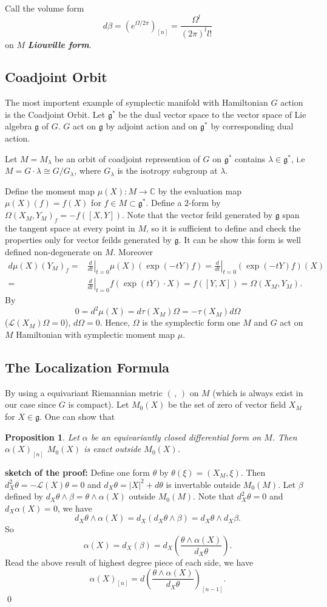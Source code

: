 \documentclass[12pt]{amsart}
\newtheorem{Prop}[Thm]{Proposition}
\def\cL{{\mathcal{L}}}
\def\bC{{\mathbb{C}}}
\def\fgg{{\mathfrak{g}}}
\def\kw#1{{\bf \em #1}}
\def\ddt{\left.\frac{d}{dt}\right|_{t=0}}
\def\sproof{{\bf sketch of the proof:}}
\begin{document}
Call the volume form 
\[
d\beta=(e^{\Omega/2\pi})_[n] = \frac{\Omega^l}{(2\pi)^ll!}
\] 
on $M$ \kw{Liouville form}.

\subsection{Coadjoint Orbit}\label{Sec:co1}
The most importent example of symplectic manifold with Hamiltonian $G$
action is the Coadjoint Orbit. 
Let $\fgg^*$ be the dual vector space to the vector space of Lie
algebra $\fgg$ of $G$. $G$ act on $\fgg$ by adjoint action and on
$\fgg^*$ by corresponding dual action.

Let $M=M_\lambda$ be an orbit of coadjoint represention of $G$ on
$\fgg^*$ contains $\lambda \in \fgg^*$, i.e $M = G\cdot \lambda\cong
G/G_\lambda$, where $G_\lambda$ is the isotropy subgroup at $\lambda$.

Define the moment map $\mu(X)\colon M \to \bC$ by the evaluation map
$\mu(X)(f) = f(X)$ for $f\in M \subset \fgg^*$.
Define a $2$-form by $\Omega(X_M,Y_M)_f =-
f([X,Y])$. Note that the vector feild generated by $\fgg$ span the
tangent space at every point in $M$, so it is sufficient to define and
check the properties only for vector feilds generated by $\fgg$. It can be show this form is well defined non-degenerate on
$M$.
Moreover 
\[
\begin{split}
d\mu(X)(Y_M)_f  =& \ddt \mu(X)(\exp(-tY)f) =  \ddt(\exp(-tY)f)(X) \\
=&
\ddt f(\exp(tY)\cdot X) = f([Y,X]) = \Omega(X_M,Y_M).
\end{split}
\]
By 
\[
0 = d^2\mu(X) = d\tau(X_M)\Omega = -\tau(X_M) d\Omega
\] ($\cL(X_M)\Omega=0$), $d\Omega=0$.
Hence, $\Omega$ is the symplectic form one $M$ and $G$ act on $M$
Hamiltonian with symplectic moment map $\mu$.



\subsection{The Localization Formula}
By using a equivariant Riemannian metric $(\,,\,)$ on $M$ (which is always exist
in our case since $G$ is compact). 
Let $M_0(X)$ be the set of zero of vector field $X_M$ for $X\in \fgg$.
One can show that 
\begin{Prop}
Let $\alpha$ be an equivariantly closed differential form on $M$. 
Then $\alpha(X)_{[n]}$ $M_0(X)$ is exact outside $M_0(X)$.
\end{Prop}
\sproof 
Define one form $\theta$ by $\theta(\xi) = (X_M, \xi)$. 
Then $d_X^2 \theta  = -\cL(X)\theta  = 0$ and $d_X\theta  = |X|^2 + d\theta$ is
invertable outside $M_0(M)$. 
Let $\beta$ defined by $ d_X\theta \wedge \beta = \theta \wedge \alpha(X)$ outside $M_0(M)$.
Note that $d_X^2 \theta=0$ and $d_X\alpha(X) = 0$, we have
\[
d_X\theta \wedge \alpha(X) = 
d_X(d_X\theta \wedge \beta) = d_X\theta \wedge d_X\beta.
\]
So 
\[
\alpha(X) = d_X(\beta) = d_X\left(\frac{\theta\wedge \alpha(X)}{d_X\theta}\right).
\]
Read the above result of highest degree piece of each side, we have
\[
\alpha(X)_{[n]} = d\left(\frac{\theta\wedge \alpha(X)}{d_X\theta}\right)_{[n-1]}.
\] \qed
\end{document}
